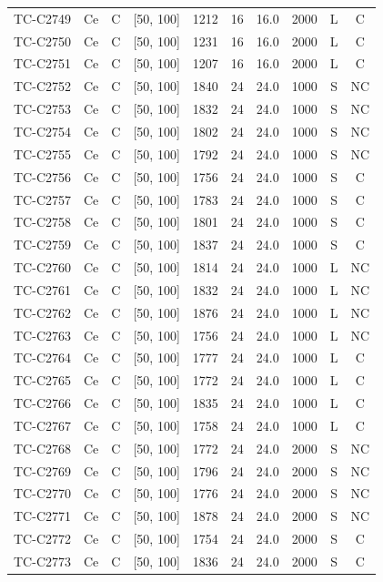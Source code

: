 \begin{longtable}{lccccccccc}
TC-C2749 & Ce & C & [50, 100] & 1212 & 16 & 16.0 & 2000 & L & C \\
TC-C2750 & Ce & C & [50, 100] & 1231 & 16 & 16.0 & 2000 & L & C \\
TC-C2751 & Ce & C & [50, 100] & 1207 & 16 & 16.0 & 2000 & L & C \\
TC-C2752 & Ce & C & [50, 100] & 1840 & 24 & 24.0 & 1000 & S & NC \\
TC-C2753 & Ce & C & [50, 100] & 1832 & 24 & 24.0 & 1000 & S & NC \\
TC-C2754 & Ce & C & [50, 100] & 1802 & 24 & 24.0 & 1000 & S & NC \\
TC-C2755 & Ce & C & [50, 100] & 1792 & 24 & 24.0 & 1000 & S & NC \\
TC-C2756 & Ce & C & [50, 100] & 1756 & 24 & 24.0 & 1000 & S & C \\
TC-C2757 & Ce & C & [50, 100] & 1783 & 24 & 24.0 & 1000 & S & C \\
TC-C2758 & Ce & C & [50, 100] & 1801 & 24 & 24.0 & 1000 & S & C \\
TC-C2759 & Ce & C & [50, 100] & 1837 & 24 & 24.0 & 1000 & S & C \\
TC-C2760 & Ce & C & [50, 100] & 1814 & 24 & 24.0 & 1000 & L & NC \\
TC-C2761 & Ce & C & [50, 100] & 1832 & 24 & 24.0 & 1000 & L & NC \\
TC-C2762 & Ce & C & [50, 100] & 1876 & 24 & 24.0 & 1000 & L & NC \\
TC-C2763 & Ce & C & [50, 100] & 1756 & 24 & 24.0 & 1000 & L & NC \\
TC-C2764 & Ce & C & [50, 100] & 1777 & 24 & 24.0 & 1000 & L & C \\
TC-C2765 & Ce & C & [50, 100] & 1772 & 24 & 24.0 & 1000 & L & C \\
TC-C2766 & Ce & C & [50, 100] & 1835 & 24 & 24.0 & 1000 & L & C \\
TC-C2767 & Ce & C & [50, 100] & 1758 & 24 & 24.0 & 1000 & L & C \\
TC-C2768 & Ce & C & [50, 100] & 1772 & 24 & 24.0 & 2000 & S & NC \\
TC-C2769 & Ce & C & [50, 100] & 1796 & 24 & 24.0 & 2000 & S & NC \\
TC-C2770 & Ce & C & [50, 100] & 1776 & 24 & 24.0 & 2000 & S & NC \\
TC-C2771 & Ce & C & [50, 100] & 1878 & 24 & 24.0 & 2000 & S & NC \\
TC-C2772 & Ce & C & [50, 100] & 1754 & 24 & 24.0 & 2000 & S & C \\
TC-C2773 & Ce & C & [50, 100] & 1836 & 24 & 24.0 & 2000 & S & C \\

\end{longtable}
